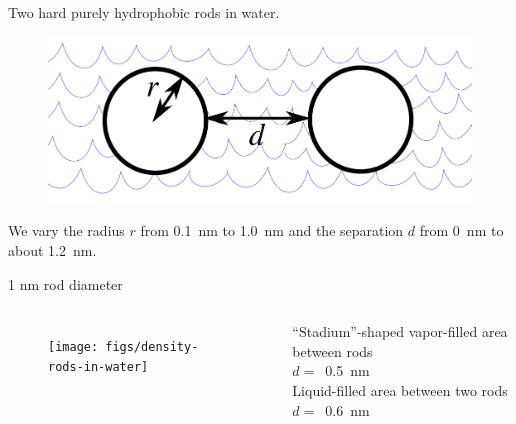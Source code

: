 \documentclass[compress]{beamer}
\begin{document}
\begin{frame}[fragile]{}
Two hard purely hydrophobic rods in water.
\begin{figure}
\begin{center}
\includegraphics[width=\columnwidth]{figs/rods-diagram}
\end{center}
\end{figure}
We vary the radius $r$ from 0.1~nm to 1.0~nm and the separation $d$
from 0~nm to about 1.2~nm.
\end{frame}

\begin{frame}[fragile]{1 nm  rod diameter}
\begin{columns}
  \begin{figure}
  \texttt{[image: figs/density-rods-in-water]}
  \end{figure} 
 \small{``Stadium''-shaped vapor-filled area between rods}\\
 \vspace{0.3cm}
 \small{$d=$~0.5~nm}\\
 \vspace{1.4cm}
 \small{Liquid-filled area between two rods}\\
 \vspace{0.3cm}
 \small{$d=$~0.6~nm}
\end{columns}
\end{frame}
\end{document}
